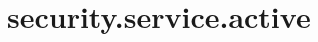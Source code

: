 \section{security.service.active}
\label{configuration:SecurityServiceActive}
\AvailableInCsharpOnly{\TODO}